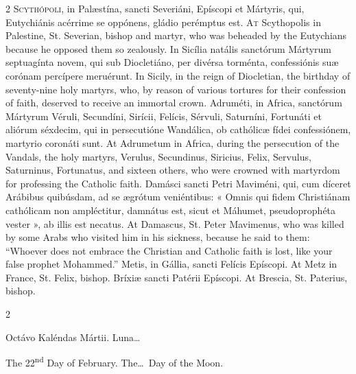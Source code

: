 \begin{paracol}{2}
\lettrine[lines=2]{S}{cythópoli,} in Palæstína, sancti Severiáni, 
 Epíscopi et Mártyris, qui, Eutychiánis acérrime se oppónens, gládio 
 perémptus est.
\switchcolumn
{}
\lettrine[lines=2]{A}{t} Scythopolis in Palestine, St. Severian, bishop and martyr, who was 
 beheaded by the Eutychians because he opposed them so zealously.
\switchcolumn*
{}
In Sicília natális sanctórum Mártyrum septuagínta novem, qui sub Diocletiáno, 
 per divérsa torménta, confessiónis suæ corónam 
 percípere meruérunt.
\switchcolumn
{}
In Sicily, in the reign of Diocletian, the birthday of seventy-nine holy 
 martyrs, who, by reason of various tortures for their confession of faith, 
 deserved to receive an immortal crown.
\switchcolumn*
{}
Adruméti, in Africa, sanctórum Mártyrum Véruli, 
 Secundíni, Sirícii, Felícis, Sérvuli, Saturníni, Fortunáti et aliórum 
 séxdecim, qui in persecutióne Wandálica, ob cathólicæ fídei confessiónem, 
 martyrio coronáti sunt.
\switchcolumn
{}
At Adrumetum in Africa, during the persecution of the Vandals, the holy 
 martyrs, Verulus, Secundinus, Siricius, Felix, Servulus, Saturninus, 
 Fortunatus, and sixteen others, who were crowned with martyrdom for 
 professing the Catholic faith.
\switchcolumn*
{}
Damásci sancti Petri Maviméni, qui, cum díceret Arábibus quibúsdam, ad se
 ægrótum veniéntibus: « Omnis qui fidem 
 Christiánam cathólicam non ampléctitur, damnátus est, sicut et Máhumet, 
 pseudoprophéta vester », ab illis est necatus.
\switchcolumn
{}
At Damascus, St. Peter Mavimenus, who was killed by some Arabs who visited 
 him in his sickness, because he said to them: ``Whoever does not embrace the 
 Christian and Catholic faith is lost, like your false prophet Mohammed.''
\switchcolumn*
{}
Metis, in Gállia, sancti Felícis Epíscopi.
\switchcolumn
{}
At Metz in France, St. Felix, bishop.
\switchcolumn*
{}
Bríxiæ sancti Patérii Epíscopi.
\switchcolumn
{}
At Brescia, St. Paterius, bishop.
\switchcolumn*
{}
\end{paracol}


\begin{paracol}{2}
\begin{center}{\color{gregoriocolor} Octávo Kaléndas Mártii. 
 Luna\dots\ }\end{center}
\switchcolumn
{}
\begin{center}{\color{gregoriocolor} The 22\textsuperscript{nd} Day of 
 February. The\dots\ Day of the Moon.}\end{center}
\end{paracol}

